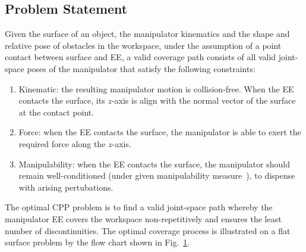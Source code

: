 \documentclass[journal]{IEEEtran}
\begin{document}
\begin{figure}[t]
\label{fig:new_flowchart_2}
\end{figure}

\subsection{Problem Statement}
Given the surface of an object, the manipulator kinematics and the shape and relative pose of obstacles in the workspace, under the assumption of a point contact between surface and EE, a valid coverage path consists of all valid joint-space poses of the manipulator that satisfy the following constraints:
\begin{enumerate}
\item Kinematic: the resulting manipulator motion is collision-free. When the EE contacts the surface, its $z$-axis is align with the normal vector of the surface at the contact point. 
\item Force: when the EE contacts the surface, the manipulator is able to exert the required force along the $z$-axis.  
\item Manipulability: when the EE contacts the surface, the manipulator should remain well-conditioned (under given manipulability measure~\cite{yoshikawa1990translational}), %
to dispense with arising pertubations. 
\end{enumerate}

The optimal CPP problem is to find a valid joint-space path whereby the manipulator EE covers the workspace non-repetitively and ensures the least number of discontinuities. The optimal coverage process is illustrated on a flat surface problem by the flow chart shown in Fig.~\ref{fig:new_flowchart_2}.
\end{document}
